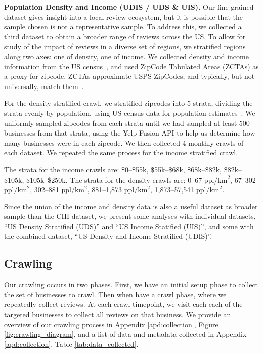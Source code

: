 \textbf{Population Density and Income (UDIS / UDS \& UIS).}
Our fine grained dataset gives insight into a local review ecosystem, but it is possible that the sample chosen is not a representative sample. To address this, we collected a third dataset to obtain a broader range of reviews across the US. To allow for study of the impact of reviews in a diverse set of regions, we stratified regions along two axes: one of density, one of income. 
We collected density and income information from the US census~\cite{acs2019householdincome}, and used ZipCode Tabulated Areas (ZCTAs) as a proxy for zipcode. ZCTAs approximate USPS ZipCodes, and typically, but not universally, match them~\cite{census2020zctas}.

For the density stratified crawl, we stratified zipcodes into 5 strata, dividing the strata evenly by population, using US census data for population estimates~\cite{acs2019populationtotal}. We uniformly sampled zipcodes from each strata until we had sampled at least 500 businesses from that strata, using the Yelp Fusion API to help us determine how many businesses were in each zipcode. We then collected 4 monthly crawls of each dataset. We repeated the same process for the income stratified crawl.

The strata for the income crawls are: \$0--\$55k, \$55k--\$68k, \$68k--\$82k, \$82k--\$105k, \$105k--\$250k. The strata for the density crawls are: 0--67 ppl/$\text{km}^2$, 67--302 ppl$/\text{km}^2$, 302--881 ppl$/\text{km}^2$, 881--1,873 ppl$/\text{km}^2$, 1,873--57,541 ppl$/\text{km}^2$.

Since the union of the income and density data is also a useful dataset as broader sample than the CHI dataset, we present some analyses with individual datasets, ``US Density Stratified (UDS)'' and ``US Income Statified (UIS)'', and some with the combined dataset, ``US Density and Income Stratified (UDIS)''.

\subsection{Crawling}\label{subsec:crawling}


Our crawling occurs in two phases.
First, we have an initial setup phase to collect the set of businesses to crawl. 
Then when have a crawl phase, where we repeatedly collect reviews. At each crawl timepoint, we visit each each of the targeted businesses to collect all reviews on that business. We provide an overview of our crawling process in Appendix \ref{apd:collection}, Figure \ref{fig:crawling_diagram}, and a list of data and metadata collected in Appendix \ref{apd:collection}, Table \ref{tab:data_collected}. 

